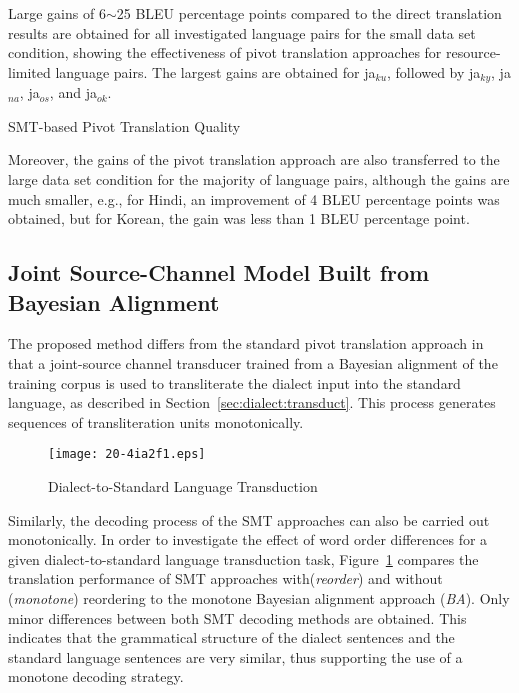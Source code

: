 \documentclass[english]{jnlp_1.4}
\begin{document}
 Large gains of 6$\sim$25 BLEU percentage points compared to the direct translation results are obtained for all investigated
 language pairs for the small data set condition, showing the effectiveness of pivot translation approaches for resource-limited language pairs.
 The largest gains are obtained for ja$_{ku}$, followed by ja$_{ky}$, ja$_{na}$, ja$_{os}$, and ja$_{ok}$.

 \begin{table}[t]
  \caption{SMT-based Pivot Translation Quality}
  \label{tab:eval:SMT:pivot}

 \end{table}

 Moreover, the gains of the pivot translation approach are also transferred to the large data set condition for the majority of language pairs,
 although the gains are much smaller, e.g., for Hindi, an improvement of 4 BLEU percentage points was obtained,
 but for Korean, the gain was less than 1 BLEU percentage point. 


\subsection{Joint Source-Channel Model Built from Bayesian Alignment}
\label{sec:experiments:ba}

The proposed method differs from the standard pivot translation approach in that a joint-source channel transducer trained
from a Bayesian alignment of the training corpus is used to transliterate the dialect input into the standard
language, as described in Section~\ref{sec:dialect:transduct}.
This process generates sequences of transliteration units monotonically.

\begin{figure}[b]
\begin{center}
\texttt{[image: 20-4ia2f1.eps]}
\end{center}
\caption{Dialect-to-Standard Language Transduction}
\label{fig:eval:loc2std}
\end{figure}

Similarly, the decoding process of the SMT approaches can also be carried out monotonically. In order to investigate
the effect of word order differences for a given dialect-to-standard language transduction task,
Figure~\ref{fig:eval:loc2std} compares the translation performance of SMT approaches with\linebreak (\textit{reorder})
and without ({\em monotone}) reordering to the monotone Bayesian alignment approach ({\em BA}).
Only minor differences between both SMT decoding methods are obtained. This indicates that the grammatical structure
of the dialect sentences and the standard language sentences are very similar, thus supporting the use of
a monotone decoding strategy.
\end{document}
